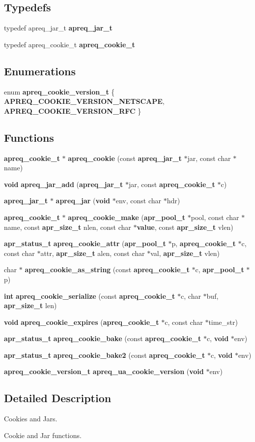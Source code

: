 \subsection*{Typedefs}
\begin{CompactItemize}
\item 
typedef apreq\_\-jar\_\-t {\bf apreq\_\-jar\_\-t}
\item 
typedef apreq\_\-cookie\_\-t {\bf apreq\_\-cookie\_\-t}
\end{CompactItemize}
\subsection*{Enumerations}
\begin{CompactItemize}
\item 
enum {\bf apreq\_\-cookie\_\-version\_\-t} \{ {\bf APREQ\_\-COOKIE\_\-VERSION\_\-NETSCAPE}, 
{\bf APREQ\_\-COOKIE\_\-VERSION\_\-RFC}
 \}
\end{CompactItemize}
\subsection*{Functions}
\begin{CompactItemize}
\item 
{\bf apreq\_\-cookie\_\-t} $\ast$ {\bf apreq\_\-cookie} (const {\bf apreq\_\-jar\_\-t} $\ast$jar, const char $\ast$name)
\item 
{\bf void} {\bf apreq\_\-jar\_\-add} ({\bf apreq\_\-jar\_\-t} $\ast$jar, const {\bf apreq\_\-cookie\_\-t} $\ast$c)
\item 
{\bf apreq\_\-jar\_\-t} $\ast$ {\bf apreq\_\-jar} ({\bf void} $\ast$env, const char $\ast$hdr)
\item 
{\bf apreq\_\-cookie\_\-t} $\ast$ {\bf apreq\_\-cookie\_\-make} ({\bf apr\_\-pool\_\-t} $\ast$pool, const char $\ast$name, const {\bf apr\_\-size\_\-t} nlen, const char $\ast${\bf value}, const {\bf apr\_\-size\_\-t} vlen)
\item 
{\bf apr\_\-status\_\-t} {\bf apreq\_\-cookie\_\-attr} ({\bf apr\_\-pool\_\-t} $\ast$p, {\bf apreq\_\-cookie\_\-t} $\ast$c, const char $\ast$attr, {\bf apr\_\-size\_\-t} alen, const char $\ast$val, {\bf apr\_\-size\_\-t} vlen)
\item 
char $\ast$ {\bf apreq\_\-cookie\_\-as\_\-string} (const {\bf apreq\_\-cookie\_\-t} $\ast$c, {\bf apr\_\-pool\_\-t} $\ast$p)
\item 
{\bf int} {\bf apreq\_\-cookie\_\-serialize} (const {\bf apreq\_\-cookie\_\-t} $\ast$c, char $\ast$buf, {\bf apr\_\-size\_\-t} len)
\item 
{\bf void} {\bf apreq\_\-cookie\_\-expires} ({\bf apreq\_\-cookie\_\-t} $\ast$c, const char $\ast$time\_\-str)
\item 
{\bf apr\_\-status\_\-t} {\bf apreq\_\-cookie\_\-bake} (const {\bf apreq\_\-cookie\_\-t} $\ast$c, {\bf void} $\ast$env)
\item 
{\bf apr\_\-status\_\-t} {\bf apreq\_\-cookie\_\-bake2} (const {\bf apreq\_\-cookie\_\-t} $\ast$c, {\bf void} $\ast$env)
\item 
{\bf apreq\_\-cookie\_\-version\_\-t} {\bf apreq\_\-ua\_\-cookie\_\-version} ({\bf void} $\ast$env)
\end{CompactItemize}


\subsection{Detailed Description}
Cookies and Jars.

 Cookie and Jar functions.

